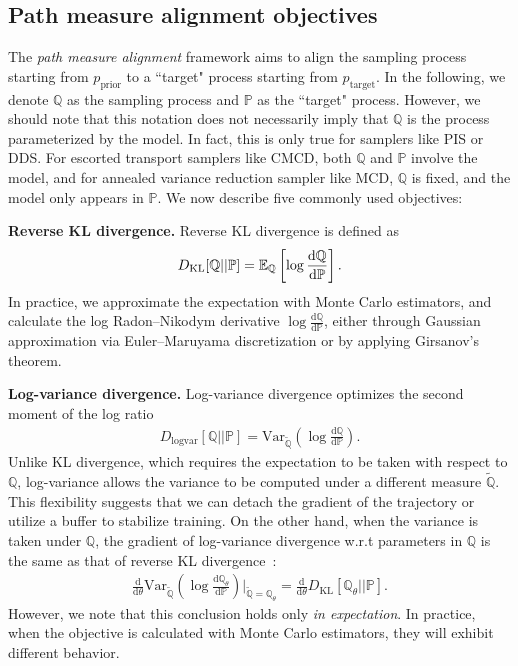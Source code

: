 \documentclass{article} %
\begin{document}
\subsection{Path measure alignment objectives}


The \textit{path measure alignment} framework aims to align the 
sampling process starting from $p_\text{prior}$ to a      ``target"  process starting from $p_\text{target}$. 
In the following, we denote  $\mathbb{Q}$ as the sampling process  and $\mathbb{P}$ as the ``target" process.
However, we should note that this notation does not necessarily imply that $\mathbb{Q}$ is the process parameterized by the model. 
In fact, this is only true for samplers like PIS or DDS. 
For escorted transport samplers like CMCD, both  $\mathbb{Q}$ and  $\mathbb{P}$ involve the model, and for annealed variance reduction sampler like MCD,  $\mathbb{Q}$ is fixed, and the model only appears in $\mathbb{P}$.
We now describe five commonly used objectives:

\textbf{Reverse KL divergence.} 
Reverse KL divergence is defined as
\begin{align}
    D_\mathrm{KL}[\mathbb{Q}||\mathbb{P}] = \mathbb{E}_{\mathbb{Q}} \left[
  \log   \frac{\mathrm{d} \mathbb{Q}}{\mathrm{d} \mathbb{P}}
    \right].
\end{align}
In practice, we approximate the expectation with Monte Carlo estimators, and calculate the log Radon–Nikodym derivative $\log   \frac{\mathrm{d} \mathbb{Q}}{\mathrm{d} \mathbb{P}}$, either through Gaussian approximation via Euler–Maruyama discretization or by applying Girsanov's theorem.

\textbf{Log-variance divergence.} Log-variance divergence optimizes the second moment of the log ratio
\begin{align}
    D_\mathrm{logvar}[\mathbb{Q}||\mathbb{P}] = \text{Var}_{\tilde{\mathbb{Q}}} \left(
  \log   \frac{\mathrm{d} \mathbb{Q}}{\mathrm{d} \mathbb{P}}
    \right).
\end{align}
Unlike KL divergence, which requires the expectation to be taken with respect to \(\mathbb{Q}\), log-variance allows the variance to be computed under a different measure \(\tilde{\mathbb{Q}}\). 
This flexibility suggests that we can detach the gradient of the trajectory or utilize a buffer to stabilize training.
On the other hand, when the variance is taken under  \(\mathbb{Q}\), the gradient of log-variance divergence w.r.t parameters in  \(\mathbb{Q}\) is the same as that of reverse KL divergence~\citep{richter2020vargrad}:
\begin{align}
    \frac{\mathrm{d}}{\mathrm{d} \mathbb{\theta}} \text{Var}_{\tilde{\mathbb{Q}}} \left(
  \log   \frac{\mathrm{d} \mathbb{Q}_{\theta}}{\mathrm{d} \mathbb{P}}
    \right)\Bigg|_{\tilde{\mathbb{Q}} = {\mathbb{Q}_{\theta}}} =    \frac{\mathrm{d}}{\mathrm{d} {\theta}}  D_\mathrm{KL}[\mathbb{Q}_{\theta}||\mathbb{P}].
\end{align}
However, we note that this conclusion holds only \emph{in expectation}.
In practice, when the objective is calculated with Monte Carlo estimators, they will exhibit different behavior.
\end{document}
